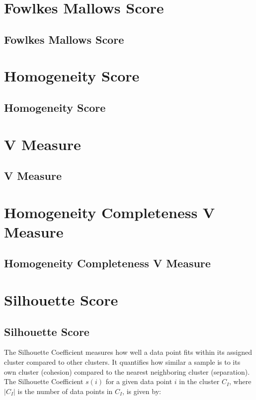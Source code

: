 \clearpage
\thispagestyle{clusteringstyle}
\section{Fowlkes Mallows Score}
\subsection{Fowlkes Mallows Score}

\clearpage
\thispagestyle{clusteringstyle}
\section{Homogeneity Score}
\subsection{Homogeneity Score}

\clearpage
\thispagestyle{clusteringstyle}
\section{V Measure}
\subsection{V Measure}

\clearpage
\thispagestyle{clusteringstyle}
\section{Homogeneity Completeness V Measure}
\subsection{Homogeneity Completeness V Measure}

\clearpage
\thispagestyle{clusteringstyle}
\section{Silhouette Score}
\subsection{Silhouette Score}

The Silhouette Coefficient measures how well a data point fits within its assigned cluster compared to other clusters. 
It quantifies how similar a sample is to its own cluster (cohesion) compared to the nearest neighboring cluster (separation).
The Silhouette Coefficient $s(i)$ for a given data point $i$ in the cluster $C_I$, where $|C_I|$ is the number of data points in $C_I$, is given by:

